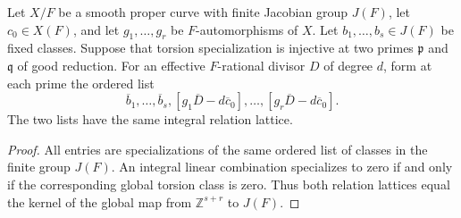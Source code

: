 \begin{lemma}\label{lem:decic-318-orbit-relations}
Let $X/F$ be a smooth proper curve with finite Jacobian group
$J(F)$, let $c_0\in X(F)$, and let $g_1,\ldots,g_r$ be
$F$-automorphisms of $X$.
Let $b_1,\ldots,b_s\in J(F)$ be fixed classes.
Suppose that torsion specialization is injective at two primes
$\mathfrak p$ and $\mathfrak q$ of good reduction.
For an effective $F$-rational divisor $D$ of degree $d$, form
at each prime the ordered list
\[
 \overline b_1,\ldots,\overline b_s,
 [g_1\overline D-d\overline c_0],\ldots,
 [g_r\overline D-d\overline c_0].
\]
The two lists have the same integral relation lattice.
\end{lemma}
\begin{proof}
All entries are specializations of the same ordered list of
classes in the finite group $J(F)$.
An integral linear combination specializes to zero if and only
if the corresponding global torsion class is zero.
Thus both relation lattices equal the kernel of the global map
from $\mathbb Z^{s+r}$ to $J(F)$.
\end{proof}
